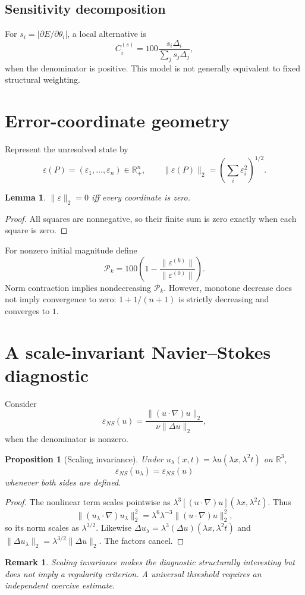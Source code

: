 \documentclass[11pt]{article}
\newtheorem{lemma}{Lemma}
\newtheorem{proposition}{Proposition}
\newtheorem{remark}{Remark}
\begin{document}
\subsection{Sensitivity decomposition}
For $s_i=|\partial E/\partial\theta_i|$, a local alternative is
\[
C_i^{(s)}=100\frac{s_i\Delta_i}{\sum_js_j\Delta_j},
\]
when the denominator is positive. This model is not generally equivalent to fixed structural weighting.

\section{Error-coordinate geometry}
Represent the unresolved state by
\[
\varepsilon(P)=(\varepsilon_1,\ldots,\varepsilon_n)\in\mathbb R_+^n,
\qquad
\|\varepsilon(P)\|_2=\left(\sum_i\varepsilon_i^2\right)^{1/2}.
\]
\begin{lemma}
$\|\varepsilon\|_2=0$ iff every coordinate is zero.
\end{lemma}
\begin{proof}
All squares are nonnegative, so their finite sum is zero exactly when each square is zero.
\end{proof}
For nonzero initial magnitude define
\[
\mathcal P_k=100\left(1-\frac{\|\varepsilon^{(k)}\|}{\|\varepsilon^{(0)}\|}\right).
\]
Norm contraction implies nondecreasing $\mathcal P_k$. However, monotone decrease does not imply convergence to zero: $1+1/(n+1)$ is strictly decreasing and converges to $1$.

\section{A scale-invariant Navier--Stokes diagnostic}
Consider
\[
\varepsilon_{NS}(u)=\frac{\|(u\cdot\nabla)u\|_2}{\nu\|\Delta u\|_2},
\]
when the denominator is nonzero.
\begin{proposition}[Scaling invariance]
Under $u_\lambda(x,t)=\lambda u(\lambda x,\lambda^2t)$ on $\mathbb R^3$,
\[
\varepsilon_{NS}(u_\lambda)=\varepsilon_{NS}(u)
\]
whenever both sides are defined.
\end{proposition}
\begin{proof}
The nonlinear term scales pointwise as $\lambda^3[(u\cdot\nabla)u](\lambda x,\lambda^2t)$. Thus
\[
\|(u_\lambda\cdot\nabla)u_\lambda\|_2^2
=\lambda^6\lambda^{-3}\|(u\cdot\nabla)u\|_2^2,
\]
so its norm scales as $\lambda^{3/2}$. Likewise $\Delta u_\lambda=\lambda^3(\Delta u)(\lambda x,\lambda^2t)$ and $\|\Delta u_\lambda\|_2=\lambda^{3/2}\|\Delta u\|_2$. The factors cancel.
\end{proof}
\begin{remark}
Scaling invariance makes the diagnostic structurally interesting but does not imply a regularity criterion. A universal threshold requires an independent coercive estimate.
\end{remark}
\end{document}
